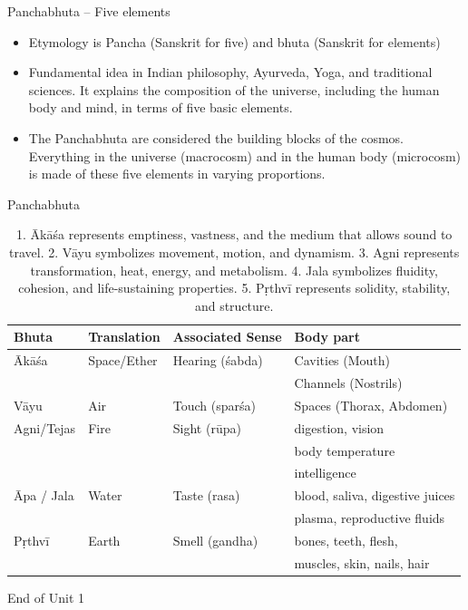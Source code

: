 %
%
\begin{frame}{Panchabhuta -- Five elements}
	\begin{itemize}
		\item Etymology is Pancha (Sanskrit for five) and bhuta (Sanskrit for elements) 
		\item Fundamental idea in Indian philosophy, Ayurveda, Yoga, and traditional sciences. It explains the composition of the universe, including the human body and mind, in terms of five basic elements.
		\item The Panchabhuta are considered the building blocks of the cosmos. Everything in the universe (macrocosm) and in the human body (microcosm) is made of these five elements in varying proportions.
	\end{itemize}
\end{frame}
%
\begin{frame}{Panchabhuta}
\begin{footnotesize}
		\begin{table}
		\begin{tabular}{l l l l}
			\toprule
			Bhuta	&	Translation 	&	Associated Sense	&	Body part	\\
			\midrule
			Ākāśa & 	Space/Ether		&	Hearing (śabda)	&
			Cavities (Mouth)	\\
			&&& Channels (Nostrils)	\\
			Vāyu	&	Air	&	Touch (sparśa)	&	Spaces (Thorax, Abdomen)	\\
			Agni/Tejas	&	Fire	&	Sight (rūpa)	& digestion, vision \\
			&&& body temperature  \\
			&&& intelligence	\\
			Āpa / Jala	&	Water	&	Taste (rasa)	&	blood, saliva, digestive juices	\\
			&&& plasma, reproductive fluids	\\
			Pṛthvī 	&	Earth	& 	Smell (gandha)	&	bones, teeth, flesh, \\
			&&&	muscles, skin, nails, hair	\\
			\bottomrule
		\end{tabular}
		\caption{{\tiny 1. Ākāśa represents emptiness, vastness, and the medium that allows sound to travel. 2. Vāyu symbolizes movement, motion, and dynamism.
		3. Agni represents transformation, heat, energy, and metabolism.
		4. Jala symbolizes fluidity, cohesion, and life-sustaining properties.
		5. Pṛthvī represents solidity, stability, and structure.}}
	\end{table}
\end{footnotesize}
\end{frame}
%
\begin{frame}{}
	\begin{huge}
		\begin{center}
			End of Unit 1
		\end{center}
	\end{huge}

\end{frame}